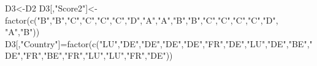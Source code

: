 \documentclass[
  letterpaper,
  DIV=11,
  numbers=noendperiod]{scrreprt}
\newenvironment{Shaded}{\begin{snugshade}}{\end{snugshade}}
\newcommand{\FunctionTok}[1]{\textcolor[rgb]{0.28,0.35,0.67}{#1}}
\newcommand{\NormalTok}[1]{\textcolor[rgb]{0.00,0.23,0.31}{#1}}
\newcommand{\OtherTok}[1]{\textcolor[rgb]{0.00,0.23,0.31}{#1}}
\newcommand{\StringTok}[1]{\textcolor[rgb]{0.13,0.47,0.30}{#1}}
\begin{document}
\begin{Shaded}
\begin{Highlighting}[]
\NormalTok{D3}\OtherTok{\textless{}{-}}\NormalTok{D2}
\NormalTok{D3[,}\StringTok{"Score2"}\NormalTok{]}\OtherTok{\textless{}{-}}\FunctionTok{factor}\NormalTok{(}\FunctionTok{c}\NormalTok{(}\StringTok{"B"}\NormalTok{,}\StringTok{"B"}\NormalTok{,}\StringTok{"C"}\NormalTok{,}\StringTok{"C"}\NormalTok{,}\StringTok{"C"}\NormalTok{,}\StringTok{"C"}\NormalTok{,}\StringTok{"D"}\NormalTok{,}\StringTok{"A"}\NormalTok{,}\StringTok{"A"}\NormalTok{,}\StringTok{"B"}\NormalTok{,}\StringTok{"B"}\NormalTok{,}\StringTok{"C"}\NormalTok{,}\StringTok{"C"}\NormalTok{,}\StringTok{"C"}\NormalTok{,}\StringTok{"C"}\NormalTok{,}\StringTok{"D"}\NormalTok{, }\StringTok{"A"}\NormalTok{,}\StringTok{"B"}\NormalTok{))}
\NormalTok{D3[,}\StringTok{"Country"}\NormalTok{]}\OtherTok{=}\FunctionTok{factor}\NormalTok{(}\FunctionTok{c}\NormalTok{(}\StringTok{"LU"}\NormalTok{,}\StringTok{"DE"}\NormalTok{,}\StringTok{"DE"}\NormalTok{,}\StringTok{"DE"}\NormalTok{,}\StringTok{"DE"}\NormalTok{,}\StringTok{"FR"}\NormalTok{,}\StringTok{"DE"}\NormalTok{,}\StringTok{"LU"}\NormalTok{,}\StringTok{"DE"}\NormalTok{,}\StringTok{"BE"}\NormalTok{,}\StringTok{"DE"}\NormalTok{,}\StringTok{"FR"}\NormalTok{,}\StringTok{"BE"}\NormalTok{,}\StringTok{"FR"}\NormalTok{,}\StringTok{"LU"}\NormalTok{,}\StringTok{"LU"}\NormalTok{,}\StringTok{"FR"}\NormalTok{,}\StringTok{"DE"}\NormalTok{))}


\end{Highlighting}
\end{Shaded}
\end{document}
